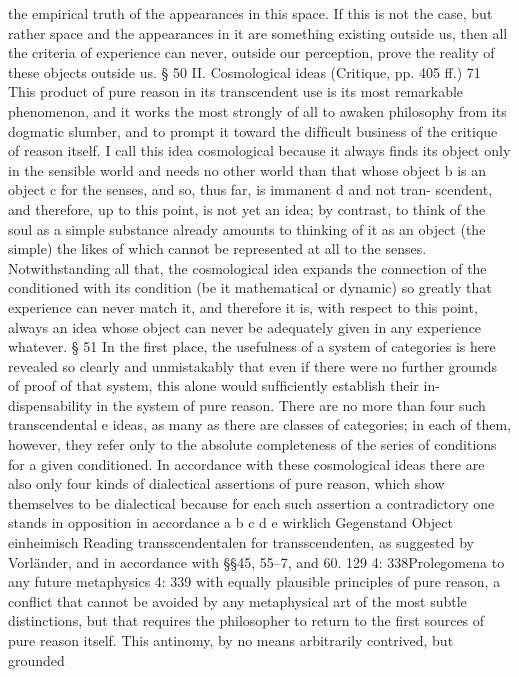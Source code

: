 the empirical truth of the appearances in this space. If this is not the case,
but rather space and the appearances in it are something existing outside
us, then all the criteria of experience can never, outside our perception,
prove the reality of these objects outside us.
§ 50
II. Cosmological ideas (Critique, pp. 405 ff.) 71
This product of pure reason in its transcendent use is its most remarkable
phenomenon, and it works the most strongly of all to awaken philosophy
from its dogmatic slumber, and to prompt it toward the difﬁcult business
of the critique of reason itself.
I call this idea cosmological because it always ﬁnds its object only in
the sensible world and needs no other world than that whose object b is
an object c for the senses, and so, thus far, is immanent d and not tran-
scendent, and therefore, up to this point, is not yet an idea; by contrast,
to think of the soul as a simple substance already amounts to thinking of
it as an object (the simple) the likes of which cannot be represented at all
to the senses. Notwithstanding all that, the cosmological idea expands
the connection of the conditioned with its condition (be it mathematical
or dynamic) so greatly that experience can never match it, and therefore
it is, with respect to this point, always an idea whose object can never be
adequately given in any experience whatever.
§ 51
In the ﬁrst place, the usefulness of a system of categories is here revealed
so clearly and unmistakably that even if there were no further grounds
of proof of that system, this alone would sufﬁciently establish their in-
dispensability in the system of pure reason. There are no more than four
such transcendental e ideas, as many as there are classes of categories; in
each of them, however, they refer only to the absolute completeness of
the series of conditions for a given conditioned. In accordance with these
cosmological ideas there are also only four kinds of dialectical assertions
of pure reason, which show themselves to be dialectical because for each
such assertion a contradictory one stands in opposition in accordance
a
b
c
d
e
wirklich
Gegenstand
Object
einheimisch
Reading transscendentalen for transscendenten, as suggested by Vorländer, and in accordance
with §§45, 55–7, and 60.
129
4: 338Prolegomena to any future metaphysics
4: 339
with equally plausible principles of pure reason, a conﬂict that cannot
be avoided by any metaphysical art of the most subtle distinctions, but
that requires the philosopher to return to the ﬁrst sources of pure reason
itself. This antinomy, by no means arbitrarily contrived, but grounded
